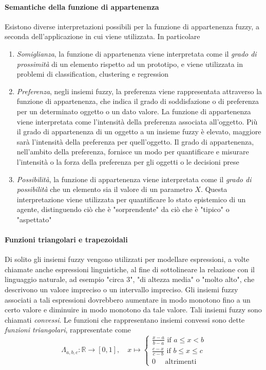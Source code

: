 \paragraph{Semantiche della funzione di appartenenza}
Esistono diverse interpretazioni possibili per la funzione di appartenenza fuzzy, a seconda dell'applicazione in cui viene utilizzata. In particolare
\begin{enumerate}
    \item \textit{Somiglianza}, la funzione di appartenenza viene interpretata come il \textit{grado di prossimità} di un elemento rispetto ad un prototipo, e viene utilizzata in problemi di classification, clustering e regression
    \item \textit{Preferenza}, negli insiemi fuzzy, la preferenza viene rappresentata attraverso la funzione di appartenenza, che indica il grado di soddisfazione o di preferenza per un determinato oggetto o un dato valore. La funzione di appartenenza viene interpretata come l'intensità della preferenza associata all'oggetto. Più il grado di appartenenza di un oggetto a un insieme fuzzy è elevato, maggiore sarà l'intensità della preferenza per quell'oggetto. Il grado di appartenenza, nell'ambito della preferenza, fornisce un modo per quantificare e misurare l'intensità o la forza della preferenza per gli oggetti o le decisioni prese
    \item \textit{Possibilità}, la funzione di appartenenza viene interpretata come il \textit{grado di possibilità} che un elemento sia il valore di un parametro $X$. Questa interpretazione viene utilizzata per quantificare lo stato epistemico di un agente, distinguendo ciò che è "sorprendente" da ciò che è "tipico" o "aspettato"
\end{enumerate}

\paragraph{Funzioni triangolari e trapezoidali}
Di solito gli insiemi fuzzy vengono utilizzati per modellare espressioni, a volte chiamate anche espressioni linguistiche, al fine di sottolineare la relazione con il linguaggio naturale, ad esempio "circa 3", "di altezza media" o "molto alto", che descrivono un valore impreciso o un intervallo impreciso. Gli insiemi fuzzy associati a tali espressioni dovrebbero aumentare in modo monotono fino a un certo valore e diminuire in modo monotono da tale valore. Tali insiemi fuzzy sono chiamati \textit{convessi}. Le funzioni che rappresentano insiemi convessi sono dette \textit{funzioni triangolari}, rappresentate come
$$
\Lambda_{a,b,c} : \mathbb{R} \to [0,1],\quad x \mapsto 
    \begin{cases}
        \frac{x-a}{b-a} \text{ if } a \leq x < b \\
        \frac{c-x}{c-b} \text{ if } b \leq x \leq c \\
        0 \quad \text{  altrimenti}
    \end{cases}
$$

